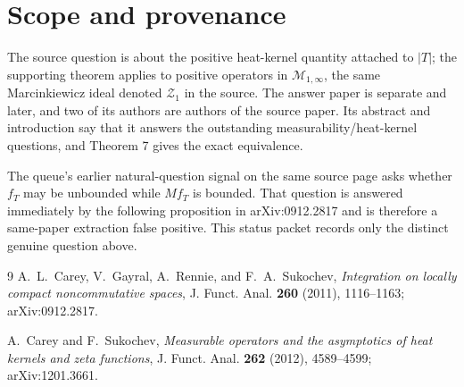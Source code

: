 \documentclass[11pt]{article}
\begin{document}
\section*{Scope and provenance}

The source question is about the positive heat-kernel quantity attached to
\(|T|\); the supporting theorem applies to positive operators in
\(\mathcal M_{1,\infty}\), the same Marcinkiewicz ideal denoted
\(\mathcal Z_1\) in the source.  The answer paper is separate and later, and
two of its authors are authors of the source paper.  Its abstract and
introduction say that it answers the outstanding measurability/heat-kernel
questions, and Theorem 7 gives the exact equivalence.

The queue's earlier natural-question signal on the same source page asks
whether \(f_T\) may be unbounded while \(Mf_T\) is bounded.  That question is
answered immediately by the following proposition in arXiv:0912.2817 and is
therefore a same-paper extraction false positive.  This status packet records
only the distinct genuine question above.

\begin{thebibliography}{9}
A.\ L.\ Carey, V.\ Gayral, A.\ Rennie, and F.\ A.\ Sukochev,
\emph{Integration on locally compact noncommutative spaces},
J. Funct. Anal. \textbf{260} (2011), 1116--1163;
arXiv:0912.2817.

A.\ Carey and F.\ Sukochev,
\emph{Measurable operators and the asymptotics of heat kernels and zeta
functions},
J. Funct. Anal. \textbf{262} (2012), 4589--4599;
arXiv:1201.3661.
\end{thebibliography}
\end{document}
